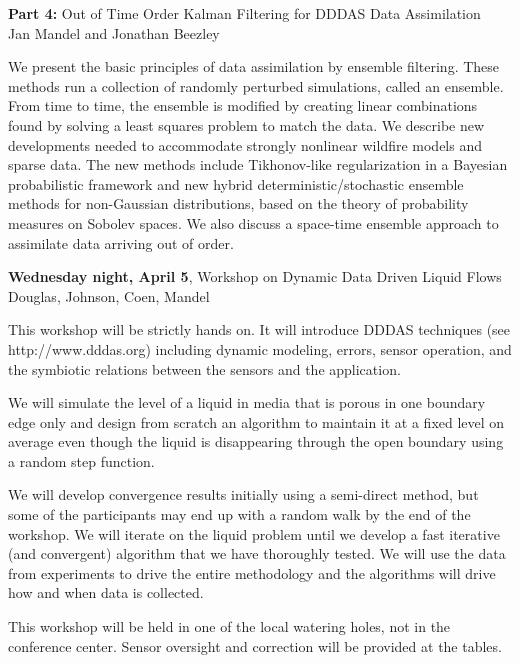 \documentclass{report}
\begin{document}
{\bf Part 4:} Out of Time Order Kalman Filtering for DDDAS Data
Assimilation
\\
Jan Mandel and Jonathan Beezley

We present the basic principles of data assimilation by
ensemble filtering.  These methods run a collection of
randomly perturbed simulations, called an ensemble.  From
time to time, the ensemble is modified by creating linear
combinations found by solving a least squares problem to
match the data.  We describe new developments needed to
accommodate strongly nonlinear wildfire models and sparse
data.  The new methods include Tikhonov-like regularization
in a Bayesian probabilistic framework and new hybrid
deterministic/stochastic ensemble methods for non-Gaussian
distributions, based on the theory of probability measures
on Sobolev spaces.  We also discuss a space-time ensemble
approach to assimilate data arriving out of order.

{\bf Wednesday night, April 5},
Workshop on Dynamic Data Driven Liquid Flows
\\ Douglas, Johnson, Coen, Mandel

This workshop will be strictly hands on.  It will introduce
DDDAS techniques (see http://www.dddas.org) including
dynamic modeling, errors, sensor operation, and the
symbiotic relations between the sensors and the application.

We will simulate the level of a liquid in media that is
porous in one boundary edge only and design from scratch an
algorithm to maintain it at a fixed level on average even
though the liquid is disappearing through the open boundary
using a random step function.

We will develop convergence results initially using a
semi-direct method, but some of the participants may end up
with a random walk by the end of the workshop.  We will
iterate on the liquid problem until we develop a fast
iterative (and convergent) algorithm that we have thoroughly
tested.  We will use the data from experiments to drive the
entire methodology and the algorithms will drive how and
when data is collected.

This workshop will be held in one of the local watering
holes, not in the conference center.  Sensor oversight and
correction will be provided at the tables.



\end{document}

